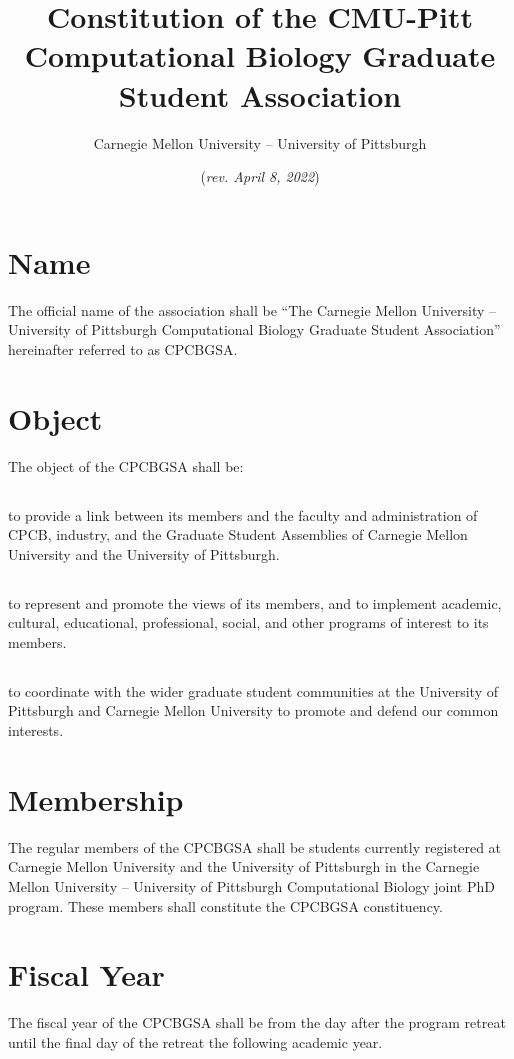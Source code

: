 \documentclass[11pt,a4paper]{article}
\title{\vspace{-80pt}Constitution of the CMU-Pitt Computational Biology Graduate Student Association\vspace{-15pt}}
\author{Carnegie Mellon University – University of Pittsburgh}
\date{\vspace{-10pt}(\emph{rev. April 8, 2022})} %
\begin{document}
 
\maketitle

\section{Name}\label{article:1}
The official name of the association shall be ``The Carnegie Mellon University – University of Pittsburgh Computational Biology Graduate Student Association” hereinafter referred to as CPCBGSA.

\section{Object}\label{article:2}
The object of the CPCBGSA shall be:
\subsection{}to provide a link between its members and the faculty and administration of CPCB, industry, and the Graduate Student Assemblies of Carnegie Mellon University and the University of Pittsburgh.

\subsection{}to represent and promote the views of its members, and to implement academic, cultural, educational, professional, social, and other programs of interest to its members.

\subsection{}to coordinate with the wider graduate student communities at the University of Pittsburgh and Carnegie Mellon University to promote and defend our common interests.

\section{Membership}\label{article:3}
The regular members of the CPCBGSA shall be students currently registered at Carnegie Mellon University and the University of Pittsburgh in the Carnegie Mellon University – University of Pittsburgh Computational Biology joint PhD program.  These members shall constitute the CPCBGSA constituency.

\section{Fiscal Year}\label{article:4}
The fiscal year of the CPCBGSA shall be from the day after the program retreat until the final day of the retreat the following academic year.
\end{document}
